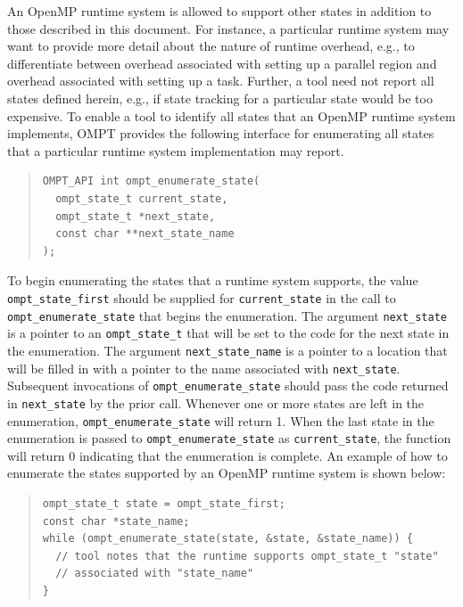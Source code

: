 \documentclass{article}
\begin{document}
 An OpenMP runtime system is allowed to support other states in addition to those described in this document.
For instance, a particular runtime system may want to 
provide more detail about the nature of runtime overhead, 
e.g., to differentiate between  overhead associated with setting up a parallel region
and  overhead associated with setting up a task. Further, a tool need not report all states defined herein, e.g., if state tracking for a particular state would be too expensive.
To enable a tool to identify all states that an OpenMP runtime system implements, OMPT provides
the following interface for enumerating all states that a particular runtime system implementation may report.

\begin{quote}
\begin{verbatim}
OMPT_API int ompt_enumerate_state(
  ompt_state_t current_state, 
  ompt_state_t *next_state, 
  const char **next_state_name
);
\end{verbatim}
\end{quote}

\noindent
To begin enumerating the states that a runtime system supports,
the value \verb|ompt_state_first| should be supplied for \verb|current_state| in the call to \verb|ompt_enumerate_state| that begins the enumeration.
The argument \verb|next_state| is a pointer to an \verb|ompt_state_t| that will be set to the code for the next state in the enumeration.
The argument \verb|next_state_name| is a pointer to a location that will be filled in with a pointer to the name associated with \verb|next_state|. 
Subsequent invocations of \verb|ompt_enumerate_state| should pass the code returned in \verb|next_state| by the prior call.
Whenever one or more states are left in the enumeration, \verb|ompt_enumerate_state| will return 1.
When the last state in the enumeration is passed to \verb|ompt_enumerate_state| as \verb|current_state|, the function will return 0 indicating that the enumeration is complete.
An example of how to enumerate the states supported by an OpenMP runtime system is shown below:

\begin{quote}
\begin{verbatim}
ompt_state_t state = ompt_state_first;
const char *state_name;
while (ompt_enumerate_state(state, &state, &state_name)) {
  // tool notes that the runtime supports ompt_state_t "state" 
  // associated with "state_name" 
}
\end{verbatim}
\end{quote}
\end{document}
